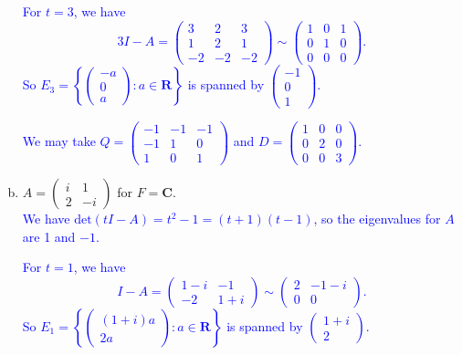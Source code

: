 \documentclass[a4paper,11pt]{article}
\newcommand{\R}{\mathbf{R}}
\newcommand{\C}{\mathbf{C}}
\newcommand{\ddet}{\text{det}}
\newcommand{\blue}[1]{\textcolor{blue}{#1}}
\begin{document}
\begin{enumerate}[(a)]
\blue{For $t=3$, we have
  \[
    3I-A =
    \left(
      \begin{array}{rrr}
        3&2&3\\
        1&2&1\\
        -2&-2&-2
      \end{array}
    \right)
    \sim
    \left(
      \begin{array}{rrr}
        1&0&1\\
        0&1&0\\
        0&0&0
      \end{array}
    \right).
  \]
  So $E_3 = \left\{ \left( \begin{smallmatrix}-a\\0\\a\end{smallmatrix} \right)
    : a \in \R \right\}$ is spanned by
  $\left( \begin{smallmatrix}-1\\0\\1\end{smallmatrix} \right)$.}

\blue{We may take
  $Q=\left( \begin{smallmatrix}-1&-1&-1\\-1&1&0\\1&0&1\end{smallmatrix}
  \right)$ and $D=\left( \begin{smallmatrix}1&0&0\\0&2&0\\0&0&3\end{smallmatrix}
  \right)$. \\}
  
\item $A=\left( \begin{smallmatrix}i&1\\2&-i\end{smallmatrix} \right)$ for
  $F=\C$. \\

  \blue{We have $\ddet(tI-A)=t^2-1=(t+1)(t-1)$, so the eigenvalues for $A$ are 1
    and $-1$.}

  \blue{For $t=1$, we have
    \[
      I-A =
      \left(
        \begin{array}{rr}
          1-i&-1\\-2&1+i
        \end{array}
      \right)
      \sim
      \left(
        \begin{array}{rr}
          2&-1-i\\0&0
        \end{array}
      \right).
    \]
    So $E_1=\left\{ \left( \begin{smallmatrix}(1+i)a\\2a\end{smallmatrix} \right)
    : a \in \R \right\}$ is spanned by
  $\left( \begin{smallmatrix}1+i\\2\end{smallmatrix} \right)$.}


\end{enumerate}
\end{document}
